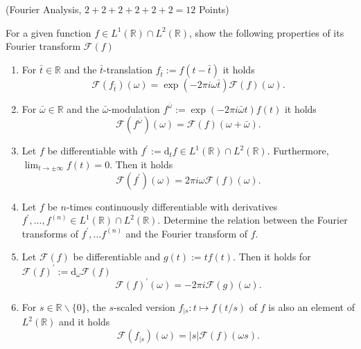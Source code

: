 \documentclass[11pt]{article}
\begin{document}






\begin{exercise} (Fourier Analysis, $2+2+2+2+2+2=12$ Points)


\noindent For a given function $f \in L^1(\mathbb{R}) \cap L^2(\mathbb{R})$, show the following properties of its Fourier transform $\mathcal{F}(f)$
\begin{enumerate}
    \item For $\bar{t} \in \mathbb{R}$ and the $\bar{t}$-translation
    $f_{\bar{t}}:=f(t-\bar{t})$ it holds
    $$
    \mathcal{F}\left(f_{\bar{t}}\right)(\omega)=\exp (-2 \pi i \omega \bar{t}) \mathcal{F}(f)(\omega) .
    $$
    \item For $\bar{\omega} \in \mathbb{R}$ and the $\bar{\omega}$-modulation
    $f^{\bar{\omega}}:=\exp (-2 \pi i \bar{\omega} t) f(t)$ it holds
$$
\mathcal{F}\left(f^{\bar{\omega}}\right)(\omega)=\mathcal{F}(f)(\omega+\bar{\omega}) .
$$
\item Let $f$ be differentiable with $f^{\prime}:=\mathrm{d}_t f \in
L^1(\mathbb{R}) \cap L^2(\mathbb{R})$. Furthermore, $\lim _{t \rightarrow \pm
\infty} f(t)=0$. Then it holds
$$
\mathcal{F}\left(f^{\prime}\right)(\omega)=2 \pi i \omega \mathcal{F}(f)(\omega) .
$$
\item Let $f$ be $n$-times continuously differentiable with derivatives
$f^{\prime}, \ldots, f^{(n)} \in L^1(\mathbb{R}) \cap L^2(\mathbb{R})$.
Determine the relation between the Fourier transforms of $f^{\prime}, \ldots
f^{(n)}$ and the Fourier transform of $f$.
\item  Let $\mathcal{F}(f)$ be differentiable and $g(t):=t f(t)$. Then it holds for $\mathcal{F}(f)^{\prime}:=\mathrm{d}_\omega \mathcal{F}(f)$
$$
\mathcal{F}(f)^{\prime}(\omega)=-2 \pi i \mathcal{F}(g)(\omega) .
$$
\item For $s \in \mathbb{R} \backslash\{0\}$, the $s$-scaled version $f_{\mid s}: t \mapsto f(t / s)$ of $f$ is also an element of $L^2(\mathbb{R})$ and it holds
$$
\mathcal{F}\left(f_{\mid s}\right)(\omega)=|s| \mathcal{F}(f)(\omega s) .
$$
\end{enumerate}
\end{exercise}
\end{document}
